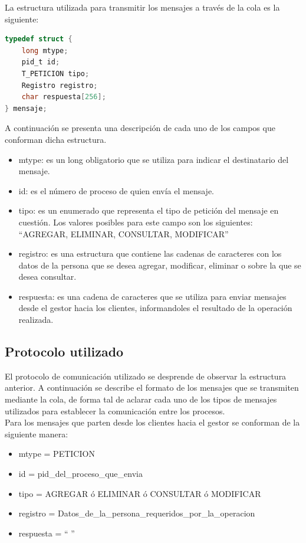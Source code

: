 \documentclass[11pt]{article}
\begin{document}
La estructura utilizada para transmitir los mensajes a trav\'es de la cola es la siguiente:

\begin{lstlisting}[language=C]
 typedef struct {
	long mtype;
	pid_t id;
	T_PETICION tipo;
	Registro registro;
	char respuesta[256];
} mensaje;
\end{lstlisting}

A continuaci\'on se presenta una descripci\'on de cada uno de los campos que conforman dicha estructura.
\begin{itemize}
\item mtype: es un long obligatorio que se utiliza para indicar el destinatario del mensaje.
\item id: es el n\'umero de proceso de quien env\'ia el mensaje.
\item tipo: es un enumerado que representa el tipo de petici\'on del mensaje en cuesti\'on. 
Los valores posibles para este campo son los siguientes: ``AGREGAR, ELIMINAR, CONSULTAR, MODIFICAR''
\item registro: es una estructura que contiene las cadenas de caracteres con los datos de la persona que se desea agregar, modificar, eliminar o sobre la que 
se desea consultar.
\item respuesta: es una cadena de caracteres que se utiliza para enviar mensajes desde el gestor hacia los clientes, 
informandoles el resultado de la operaci\'on realizada.
\end{itemize}


\subsection{Protocolo utilizado}
El protocolo de comunicaci\'on utilizado se desprende de observar la estructura anterior. A continuaci\'on se describe el formato 
de los mensajes que se transmiten mediante la cola, de forma tal de aclarar cada uno de los tipos de mensajes utilizados para establecer la 
comunicaci\'on entre los procesos. \\
Para los mensajes que parten desde los clientes hacia el gestor se conforman de la siguiente manera:
\begin{itemize}
 \item mtype = PETICION
 \item id = pid\_del\_proceso\_que\_envia
 \item tipo = AGREGAR \'o ELIMINAR \'o CONSULTAR \'o MODIFICAR
 \item registro = Datos\_de\_la\_persona\_requeridos\_por\_la\_operacion
 \item respuesta = `` ''
\end{itemize}
\end{document}
